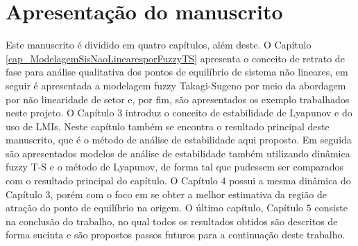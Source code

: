 \section{Apresentação do manuscrito}

Este manuscrito é dividido em quatro capítulos, além deste. O Capítulo \ref{cap_ModelagemSisNaoLinearesporFuzzyTS} apresenta o conceito de retrato de fase para análise qualitativa dos pontos de equilíbrio de sistema não lineares, em seguir é apresentada a modelagem fuzzy Takagi-Sugeno por meio da abordagem por não linearidade de setor e, por fim, são apresentados os exemplo trabalhados neste projeto. O Capítulo $3$ introduz o conceito de estabilidade de Lyapunov e do uso de LMIs. Neste capítulo também se encontra o resultado principal deste manuscrito, que é o método de análise de estabilidade aqui proposto. Em seguida são apresentados modelos de análise de estabilidade também utilizando dinâmica fuzzy T-S e o método de Lyapunov, de forma tal que pudessem ser comparados com o resultado principal do capítulo. O Capítulo $4$ possui a mesma dinâmica do Capítulo $3$, porém com o foco em se obter a melhor estimativa da região de atração do ponto de equilíbrio na origem. O último capítulo, Capítulo $5$ consiste na conclusão do trabalho, no qual todos os resultados obtidos são descritos de forma sucinta e são propostos passos futuros para a continuação deste trabalho.